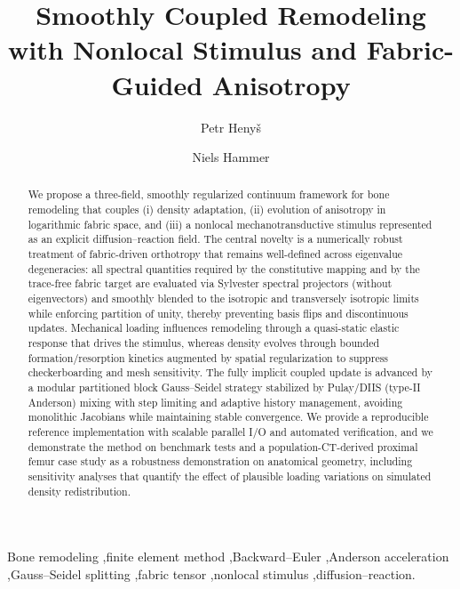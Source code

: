 \documentclass[final,3p]{elsarticle}
\theoremstyle{plain}
\begin{document}
\begin{frontmatter}
\title{Smoothly Coupled Remodeling with Nonlocal Stimulus and Fabric-Guided Anisotropy}
\author[1]{Petr Henyš} %
\author[2]{Niels Hammer}

\begin{abstract}
We propose a three-field, smoothly regularized continuum framework for bone remodeling that couples (i) density adaptation, (ii) evolution of anisotropy in logarithmic fabric space, and (iii) a nonlocal mechanotransductive stimulus represented as an explicit diffusion--reaction field. The central novelty is a numerically robust treatment of fabric-driven orthotropy that remains well-defined across eigenvalue degeneracies: all spectral quantities required by the constitutive mapping and by the trace-free fabric target are evaluated via Sylvester spectral projectors (without eigenvectors) and smoothly blended to the isotropic and transversely isotropic limits while enforcing partition of unity, thereby preventing basis flips and discontinuous updates. Mechanical loading influences remodeling through a quasi-static elastic response that drives the stimulus, whereas density evolves through bounded formation/resorption kinetics augmented by spatial regularization to suppress checkerboarding and mesh sensitivity. The fully implicit coupled update is advanced by a modular partitioned block Gauss--Seidel strategy stabilized by Pulay/DIIS (type-II Anderson) mixing with step limiting and adaptive history management, avoiding monolithic Jacobians while maintaining stable convergence. We provide a reproducible reference implementation with scalable parallel I/O and automated verification, and we demonstrate the method on benchmark tests and a population-CT-derived proximal femur case study as a robustness demonstration on anatomical geometry, including sensitivity analyses that quantify the effect of plausible loading variations on simulated density redistribution.
\end{abstract}


\begin{keyword}
Bone remodeling \sep finite element method \sep Backward--Euler \sep Anderson acceleration \sep Gauss--Seidel splitting \sep fabric tensor \sep nonlocal stimulus \sep diffusion--reaction.
\end{keyword}
\end{frontmatter}
\end{document}
